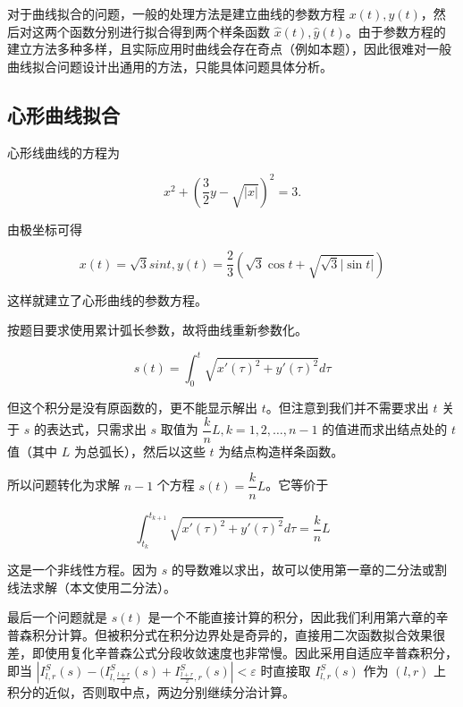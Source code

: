 \documentclass{ctexart}
\begin{document}
对于曲线拟合的问题，一般的处理方法是建立曲线的参数方程 $x(t),y(t)$，然后对这两个函数分别进行拟合得到两个样条函数 $\hat{x}(t),\hat{y}(t)$。由于参数方程的建立方法多种多样，且实际应用时曲线会存在奇点（例如本题），因此很难对一般曲线拟合问题设计出通用的方法，只能具体问题具体分析。

\subsection{心形曲线拟合}

心形线曲线的方程为

\begin{equation}
    x^2+(\dfrac 32y-\sqrt{|x|})^2=3.
\end{equation}

由极坐标可得

\begin{equation}
    x(t)=\sqrt{3} sin t,y(t)=\dfrac 23(\sqrt 3\cos t+\sqrt{\sqrt 3|\sin t|})
\end{equation}

这样就建立了心形曲线的参数方程。

按题目要求使用累计弧长参数，故将曲线重新参数化。

\begin{equation}
    s(t)=\int_0^t\sqrt{x'(\tau)^2+y'(\tau)^2}d\tau
\end{equation}

但这个积分是没有原函数的，更不能显示解出 $t$。但注意到我们并不需要求出 $t$ 关于 $s$ 的表达式，只需求出 $s$ 取值为 $\dfrac kn L,k=1,2,\dots,n-1$ 的值进而求出结点处的 $t$ 值（其中 $L$ 为总弧长），然后以这些 $t$ 为结点构造样条函数。

所以问题转化为求解 $n-1$ 个方程 $s(t)=\dfrac kn L$。它等价于

\begin{equation}
    \int_{t_k}^{t_{k+1}}\sqrt{x'(\tau)^2+y'(\tau)^2}d\tau=\dfrac kn L
\end{equation}

这是一个非线性方程。因为 $s$ 的导数难以求出，故可以使用第一章的二分法或割线法求解（本文使用二分法）。

最后一个问题就是 $s(t)$ 是一个不能直接计算的积分，因此我们利用第六章的辛普森积分计算。但被积分式在积分边界处是奇异的，直接用二次函数拟合效果很差，即使用复化辛普森公式分段收敛速度也非常慢。因此采用自适应辛普森积分，即当 $|I^S_{l,r}(s)-(I^S_{l,\frac {l+r}2}(s)+I^S_{\frac {l+r}2,r}(s)|<\varepsilon$ 时直接取 $I^S_{l,r}(s)$ 作为 $(l,r)$ 上积分的近似，否则取中点，两边分别继续分治计算。
\end{document}
